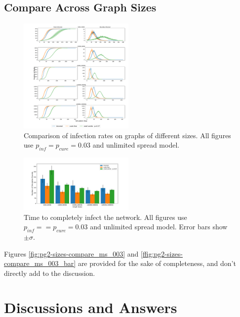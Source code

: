 \documentclass[conference]{IEEEtran}
\begin{document}
\subsection{Compare Across Graph Sizes}


\begin{figure}[htb]
  \begin{center}
	\includegraphics[width=0.5\textwidth]{img/pg1-sizes-compare_ms_p003.pdf}
  \end{center}
	\caption{Comparison of infection rates on graphs of different sizes. All figures use $p_{inf} = p_{cure} =  0.03$ and unlimited spread model.}
	\label{fig:pg2-sizes-compare_ms_p003}
\end{figure}

\begin{figure}[htb]
  \begin{center}
	\includegraphics[width=0.5\textwidth]{img/pg1-sizes-compare_ms_003_bar.pdf}
  \end{center}
	\caption{Time to completely infect the network. All figures use $p_{inf} =  = p_{cure} = 0.03$ and unlimited spread model. Error bars show $\pm \sigma$.}
	\label{fig:pg2-sizes-compare_ms_003_bar}
\end{figure}

Figures \autoref{fig:pg2-sizes-compare_ms_003} and \autoref{ffig:pg2-sizes-compare_ms_003_bar} are provided for the sake of completeness, and don't directly add to the discussion.

\section{Discussions and Answers}\label{sec:disc-answers}
\end{document}
